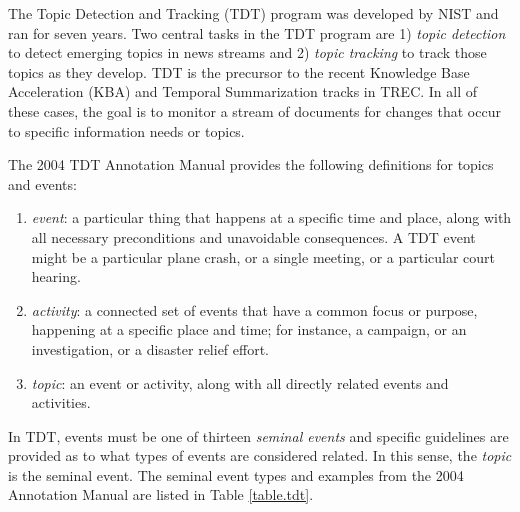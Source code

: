 \documentclass{sig-alternate}
\begin{document}
The Topic Detection and Tracking (TDT) program was developed by NIST and ran for seven years.  Two central tasks in the TDT program are 1) \emph{topic detection} to detect emerging topics in news streams and 2) \emph{topic tracking} to track those topics as they develop. TDT is the precursor to the recent Knowledge Base Acceleration (KBA) and Temporal Summarization tracks in TREC. In all of these cases, the goal is to monitor a stream of documents for changes that occur to specific information needs or topics.

The 2004 TDT Annotation Manual provides the following definitions for topics and events:

\begin{enumerate}
\item \emph{event}:  a particular thing that happens at a specific time and place, along with all necessary preconditions and unavoidable consequences. A
TDT event might be a particular plane crash, or a single meeting, or a particular court hearing. 
\item \emph{activity}:  a connected set of events that have a common focus or purpose, happening at a specific place and time; for instance, a
campaign, or an investigation, or a disaster relief effort. 
\item \emph{topic}: an event or activity, along with all directly related events and activities. 
\end{enumerate}

In TDT, events must be one of thirteen \emph{seminal events} and specific guidelines are provided as to what types of events are considered related.  In this sense, the \emph{topic} is the seminal event. The seminal event types and  examples from the 2004 Annotation Manual are listed in Table \ref{table.tdt}. 
\end{document}
